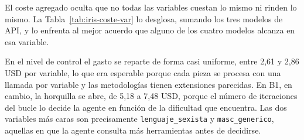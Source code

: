El coste agregado oculta que no todas las variables cuestan lo mismo ni rinden lo
mismo. La Tabla~\ref{tab:iris-coste-var} lo desglosa, sumando los tres modelos de
API, y lo enfrenta al mejor acuerdo que alguno de los cuatro modelos alcanza en esa
variable.

\begin{table}[H]
    \centering
    \begingroup
    \small
    \endgroup
\end{table}

En el nivel de control el gasto se reparte de forma casi uniforme, entre 2,61 y
2,86 USD por variable, lo que era esperable porque cada pieza se procesa con una
llamada por variable y las metodologías tienen extensiones parecidas. En B1, en
cambio, la horquilla se abre, de 5,18 a 7,48 USD, porque el número de iteraciones
del bucle lo decide la agente en función de la dificultad que encuentra. Las dos
variables más caras son precisamente \texttt{lenguaje\_sexista} y
\texttt{masc\_generico}, aquellas en que la agente consulta más herramientas antes
de decidirse.

